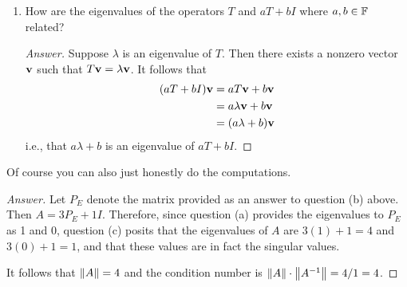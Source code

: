 \documentclass[../psets.tex]{subfiles}
\begin{document}
\begin{enumerate}[label={\textbf{4.\arabic*.}}]
\begin{enumerate}
\begin{proof}[Answer]
            \begin{equation*}
                \frac{1}{3}
                \begin{pmatrix}
                    1 & 1 & 1\\
                    1 & 1 & 1\\
                    1 & 1 & 1\\
                \end{pmatrix}
            \end{equation*}
        \end{proof}
        \item How are the eigenvalues of the operators $T$ and $aT+bI$ where $a,b\in\mathbb{F}$ related?
        \begin{proof}[Answer]
            Suppose $\lambda$ is an eigenvalue of $T$. Then there exists a nonzero vector $\mathbf{v}$ such that $T\mathbf{v}=\lambda\mathbf{v}$. It follows that
            \begin{align*}
                (aT+bI)\mathbf{v} &= aT\mathbf{v}+b\mathbf{v}\\
                &= a\lambda\mathbf{v}+b\mathbf{v}\\
                &= (a\lambda+b)\mathbf{v}
            \end{align*}
            i.e., that $a\lambda+b$ is an eigenvalue of $aT+bI$.
        \end{proof}
    \end{enumerate}
    Of course you can also just honestly do the computations.
    \begin{proof}[Answer]
        Let $P_E$ denote the matrix provided as an answer to question (b) above. Then $A=3P_E+1I$. Therefore, since question (a) provides the eigenvalues to $P_E$ as 1 and 0, question (c) posits that the eigenvalues of $A$ are $3(1)+1=4$ and $3(0)+1=1$, and that these values are in fact the singular values.\par
        It follows that $\norm{A}=4$ and the condition number is $\norm{A}\cdot\norm{A^{-1}}=4/1=4$.
    \end{proof}
\end{enumerate}
\end{document}
